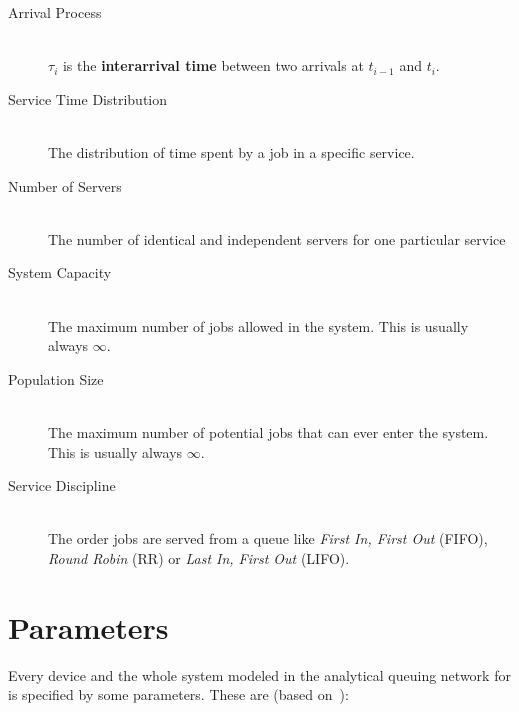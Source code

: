 \documentclass[a4paper, oneside]{csthesis}
\begin{document}
    \begin{description}
    \item[Arrival Process] \ \\ 
      $\tau_i$ is the {\bf interarrival time} between two arrivals at $t_{i-1}$
      and $t_{i}$.
    \item[Service Time Distribution] \ \\
      The distribution of time spent by a job in a specific service.
    \item[Number of Servers] \ \\
      The number of identical and independent servers for one particular service
    \item[System Capacity] \ \\
      The maximum number of jobs allowed in the system. This is usually always
      $\infty$.
    \item[Population Size] \ \\
      The maximum number of potential jobs that can ever enter the system. This
      is usually always $\infty$.
    \item[Service Discipline] \ \\
      The order jobs are served from a queue like {\it First In, First Out}
      (FIFO), {\it Round Robin} (RR) or {\it Last In, First Out} (LIFO).
    \end{description}

\section{Parameters}
    Every device and the whole system modeled in the analytical queuing network
    for \telesto{} is specified by some parameters. These are (based
    on~\cite{jain2008art}):
    
\end{document}
